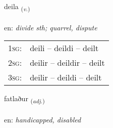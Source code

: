 \documentclass[frontgrid, backgrid]{flacards}\usepackage[]{graphicx}\usepackage[]{color}
\begin{document}
\renewcommand{\blhead}{\vskip5pt {\small\bfseries\footnotesize Sagnorð | Verb }}
\renewcommand{\bcfoot}{\vskip5pt \hspace{2pt}{\small\bfseries\footnotesize 2K}}


{deila \small{\textsubscript{(\textit{v.})}} \\[1ex] %
\textphonetic{[teiːla]} \\
en: \emph{divide sth; quarrel, dispute} \\  [2ex]
\renewcommand*{\arraystretch}{0.8}
\begin{tabular}{p{1cm}l}
\textsc{1sg}: & deili -- deildi -- deilt \\ 
\textsc{2sg}: & deilir -- deildir -- deilt \\ 
\textsc{3sg}: & deilir -- deildi -- deilt \\ 
\end{tabular}
}

\renewcommand{\flhead}{\vskip5pt \fboxsep=0pt {\small\bfseries\footnotesize Lýsingarorð | Adjective}}
\renewcommand{\fcfoot}{\vskip5pt \fboxsep=0pt \hspace{2pt}{\small\bfseries\footnotesize 2K}}

\renewcommand{\blhead}{\vskip5pt {\small\bfseries\footnotesize Lýsingarorð | Adjective }}
\renewcommand{\bcfoot}{\vskip5pt \hspace{2pt}{\small\bfseries\footnotesize 2K}}


{fatlaður \small{\textsubscript{(\textit{adj.})}} \\[1ex] %
\textphonetic{[fahtlaðʏr]} \\
en: \emph{handicapped, disabled} \\  [2ex]
\renewcommand*{\arraystretch}{0.8}
}
\end{document}
